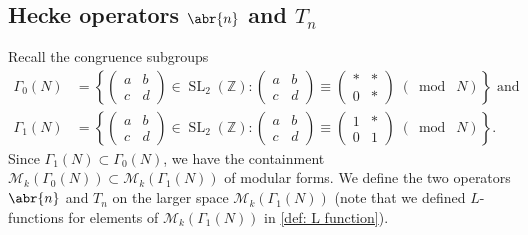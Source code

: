\documentclass[10pt,leqno,twoside]{article}
\theoremstyle{plain}
\theoremstyle{definition}
\numberwithin{equation}{section}
\numberwithin{lem}{section}
\newcommand{\cbr}[1]{\left\{#1\right\}}
\DeclareMathOperator{\SL}{SL}
\newcommand{\smod}[1]{\;(\bmod\; #1)}
\newcommand{\abcd}{\begin{pmatrix}
    a & b \\ c & d
\end{pmatrix}}
\newcommand{\slz}{\SL_2(\mathbb{Z})}
\begin{document}
\subsection{Hecke operators $\abr{n}$ and $T_n$}
Recall the congruence subgroups \begin{align*}
    \varGamma_0(N) &= \cbr{\abcd\in\slz: \abcd\equiv\begin{pmatrix}
        \ast & \ast \\ 0 & \ast
    \end{pmatrix}\smod N}\text{ and}\\
    \varGamma_1(N) &= \cbr{\abcd\in \slz: \begin{pmatrix}
        a & b \\ c & d 
    \end{pmatrix}\equiv \begin{pmatrix}
        1 & \ast \\ 0 & 1
    \end{pmatrix}\smod N}.
\end{align*} Since $\varGamma_1(N)\subset 
\varGamma_0(N)$, we have the containment $\mathcal M_k(\varGamma_0(N))\subset \mathcal M_k(\varGamma_1(N))$ of modular forms. We define the two operators $\abr{n}$ and $T_n$ on the larger space $\mathcal M_k(\varGamma_1(N))$ (note that we defined $L$-functions for elements of $\mathcal M_k(\varGamma_1(N))$ in \cref{def: L function}).
\end{document}

